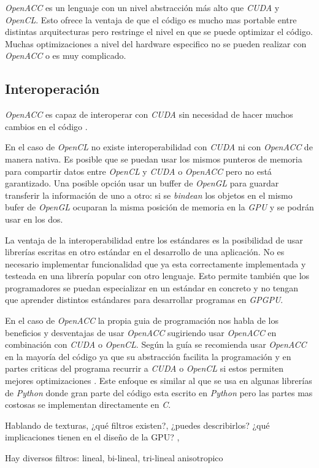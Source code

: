 \begin{pregunta}
\emph{OpenACC} es un lenguaje con un nivel abstracción más alto que \emph{CUDA}
y \emph{OpenCL}. Esto ofrece la ventaja de que el código es mucho mas portable
entre distintas arquitecturas pero restringe el nivel en que se puede optimizar
el código. Muchas optimizaciones a nivel del hardware especifico no se pueden
realizar con \emph{OpenACC} o es muy complicado.

\pagebreak
\subsection*{Interoperación}

\emph{OpenACC} es capaz de interoperar con \emph{CUDA}
sin necesidad de hacer muchos cambios en el código \cite{noauthor_3_2014}.

En el caso de \emph{OpenCL} no existe interoperabilidad con \emph{CUDA} ni con
\emph{OpenACC} de manera nativa. Es posible que se puedan usar los mismos
punteros de memoria para compartir datos entre \emph{OpenCL} y \emph{CUDA} o
\emph{OpenACC} pero no está garantizado.
Una posible opción usar un buffer de \emph{OpenGL} para guardar transferir la
información de uno a otro: si se \emph{bindean} los objetos en el mismo bufer de
\emph{OpenGL} ocuparan la misma posición de memoria en la \emph{GPU} y se podrán
usar en los dos.

La ventaja de la interoperabilidad entre los estándares es la posibilidad de usar
librerías escritas en otro estándar en el desarrollo de una aplicación. No es
necesario implementar funcionalidad que ya esta correctamente implementada y
testeada en una librería popular con otro lenguaje. Esto permite también que los
programadores se puedan especializar en un estándar en concreto y no tengan que
aprender distintos estándares para desarrollar programas en \emph{GPGPU}.

En el caso de \emph{OpenACC} la propia guia de programación nos habla de los
beneficios y desventajas de usar \emph{OpenACC} sugiriendo usar \emph{OpenACC}
en combinación con \emph{CUDA} o \emph{OpenCL}. Según la guía se recomienda usar
\emph{OpenACC} en la mayoría del código ya que su abstracción facilita la
programación y en partes criticas del programa recurrir a \emph{CUDA} o
\emph{OpenCL} si estos permiten mejores optimizaciones
\cite{noauthor_openacc_nodate}. Este enfoque es similar al que se usa en algunas
librerías de \emph{Python} donde gran parte del código esta escrito en \emph{Python}
pero las partes mas costosas se implementan directamente en \emph{C}.

\end{pregunta}
\begin{pregunta}{Hablando de texturas, ¿qué filtros existen?, ¿puedes describirlos? ¿qué
implicaciones tienen en el diseño de la GPU?} \sep{}

Hay diversos filtros: lineal, bi-lineal, tri-lineal anisotropico

\cite{heckbert_survey_1986}

\end{pregunta}
